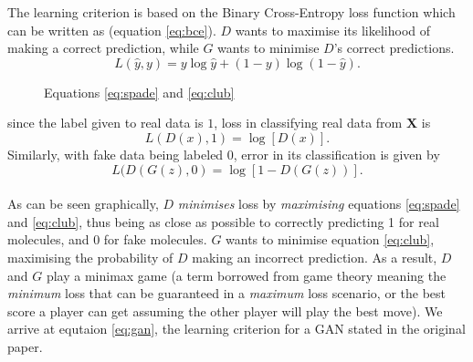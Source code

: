 \documentclass[12pt,a4paper]{article}
\begin{document}
The learning criterion is based on the Binary Cross-Entropy loss function which can be written as (equation \ref{eq:bce}). $D$ wants to maximise its likelihood of making a correct prediction, while $G$ wants to minimise $D$'s correct predictions.
\begin{equation}
    L(\hat{y},y) = y\log{\hat y}+(1-y)\log(1-\hat y) \label{eq:bce}.
\end{equation} 
\begin{figure}
    \vspace{-0.75cm}
    \caption*{Equations \ref{eq:spade} and \ref{eq:club}}
\end{figure}
since the label given to real data is $1$, loss in classifying real data from $\textbf{X}$ is 
\begin{equation}
        L(D(x),1) = \log[D(x)] \label{eq:spade}.
\end{equation}
Similarly, with fake data being labeled $0$, error in its classification is given by
\begin{equation} \label{eq:club}
    L(D(G(z),0) = \log[1-D(G(z))].
\end{equation}
\\ As can be seen graphically, $D$ \emph{minimises} loss by \emph{maximising} equations \ref{eq:spade} and \ref{eq:club}, thus being as close as possible to correctly predicting 1 for real molecules, and 0 for fake molecules. $G$ wants to minimise equation \ref{eq:club}, maximising the probability of $D$ making an incorrect prediction. As a result, $D$ and $G$ play a minimax game (a term borrowed from game theory meaning the \emph{minimum} loss that can be guaranteed in a \emph{maximum} loss scenario, or the best score a player can get assuming the other player will play the best move). We arrive at equtaion \ref{eq:gan}, the learning criterion for a GAN stated in the original paper\cite{goodfellow_generative_2014}.
\end{document}
